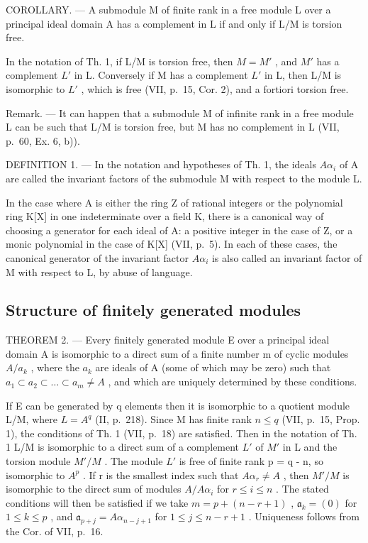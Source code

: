 COROLLARY. --- A submodule M of finite rank in a free module L over a principal ideal domain A has a complement in L if and only if L/M is torsion free.

In the notation of Th. 1, if L/M is torsion free, then \(M = M'\) , and \(M'\) has a complement \(L'\) in L. Conversely if M has a complement \(L'\) in L, then L/M is isomorphic to \(L'\) , which is free (VII, p.~15, Cor. 2), and a fortiori torsion free.

Remark. --- It can happen that a submodule M of infinite rank in a free module L can be such that L/M is torsion free, but M has no complement in L (VII, p.~60, Ex. 6, b)).

DEFINITION 1. --- In the notation and hypotheses of Th. 1, the ideals \(A\alpha_{i}\) of A are called the invariant factors of the submodule M with respect to the module L.

In the case where A is either the ring Z of rational integers or the polynomial ring K{[}X{]} in one indeterminate over a field K, there is a canonical way of choosing a generator for each ideal of A: a positive integer in the case of Z, or a monic polynomial in the case of K{[}X{]} (VII, p.~5). In each of these cases, the canonical generator of the invariant factor \(A\alpha_{i}\) is also called an invariant factor of M with respect to L, by abuse of language.

\subsection{Structure of finitely generated modules}

THEOREM 2. --- Every finitely generated module E over a principal ideal domain A is isomorphic to a direct sum of a finite number m of cyclic modules \(A/a_{k}\) , where the \(a_{k}\) are ideals of A (some of which may be zero) such that \(a_{1} \subset a_{2} \subset \ldots \subset a_{m} \neq A\) , and which are uniquely determined by these conditions.

If E can be generated by q elements then it is isomorphic to a quotient module L/M, where \(L = A^{q}\) (II, p.~218). Since M has finite rank \(n \leqslant q\) (VII, p.~15, Prop. 1), the conditions of Th. 1 (VII, p.~18) are satisfied. Then in the notation of Th. 1 L/M is isomorphic to a direct sum of a complement \(L'\) of \(M'\) in L and the torsion module \(M'/M\) . The module \(L'\) is free of finite rank p = q - n, so isomorphic to \(A^{p}\) . If r is the smallest index such that \(A\alpha_{r} \neq A\) , then \(M'/M\) is isomorphic to the direct sum of modules \(A/A\alpha_{i}\) for \(r \leqslant i \leqslant n\) . The stated conditions will then be satisfied if we take \(m = p + (n - r + 1)\) , \(\mathfrak{a}_{k} = (0)\) for \(1 \leqslant k \leqslant p\) , and \(\mathfrak{a}_{p+j} = A\alpha_{n-j+1}\) for \(1 \leqslant j \leqslant n - r + 1\) . Uniqueness follows from the Cor. of VII, p.~16.


